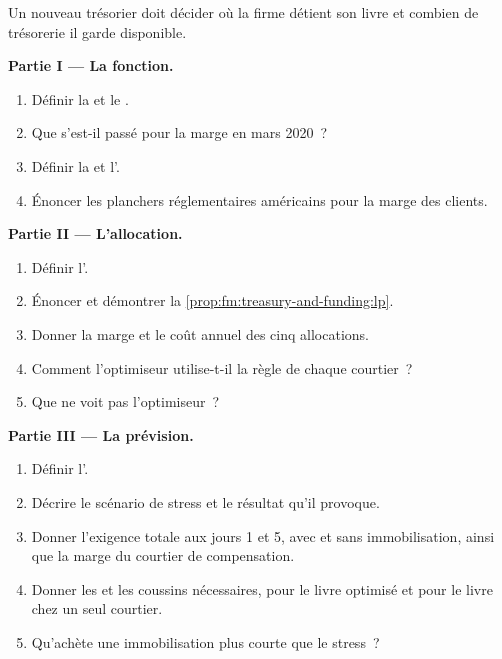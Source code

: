 \begin{problem}\label{pb:fm:treasury-and-funding:1}
Un nouveau trésorier doit décider où la firme détient son livre et combien de trésorerie il garde disponible.

\medskip\noindent\textbf{Partie I --- La fonction.}
\begin{enumerate}
\item Définir la  et le .
\item Que s'est-il passé pour la marge en mars 2020~?
\item Définir la  et l'.
\item Énoncer les planchers réglementaires américains pour la marge des clients.
\end{enumerate}

\medskip\noindent\textbf{Partie II --- L'allocation.}
\begin{enumerate}[resume]
\item Définir l'.
\item Énoncer et démontrer la \cref{prop:fm:treasury-and-funding:lp}.
\item Donner la marge et le coût annuel des cinq allocations.
\item Comment l'optimiseur utilise-t-il la règle de chaque courtier~?
\item Que ne voit pas l'optimiseur~?
\end{enumerate}

\medskip\noindent\textbf{Partie III --- La prévision.}
\begin{enumerate}[resume]
\item Définir l'.
\item Décrire le scénario de stress et le résultat qu'il provoque.
\item Donner l'exigence totale aux jours 1 et 5, avec et sans immobilisation, ainsi que la marge du courtier de compensation.
\item Donner les  et les coussins nécessaires, pour le livre optimisé et pour le livre chez un seul courtier.
\item Qu'achète une immobilisation plus courte que le stress~?
\end{enumerate}


\end{problem}
